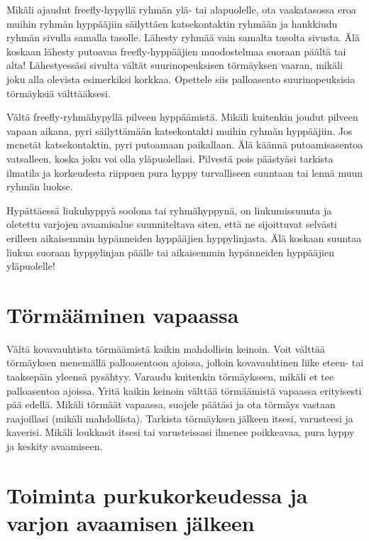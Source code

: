 Mikäli ajaudut freefly-hypyllä ryhmän ylä- tai alapuolelle, ota vaakatasossa eroa muihin ryhmän hyppääjiin säilyttäen katsekontaktin ryhmään ja hankkiudu ryhmän sivulla samalla tasolle. Lähesty ryhmää vain samalta tasolta sivusta. Älä koskaan lähesty putoavaa freefly-hyppääjien muodostelmaa suoraan päältä tai alta! Lähestyessäsi sivulta vältät suurinopeuksisen törmäyksen vaaran, mikäli joku alla olevista esimerkiksi korkkaa. Opettele siis palloasento suurinopeuksisia törmäyksiä välttääksesi. 


Vältä freefly-ryhmähypyllä pilveen hyppäämistä. Mikäli kuitenkin joudut pilveen vapaan aikana, pyri säilyttämään katsekontakti muihin ryhmän hyppääjiin. Jos menetät katsekontaktin, pyri putoamaan paikallaan. Älä käännä putoamisasentoa vatsalleen, koska joku voi olla yläpuolellasi. Pilvestä pois päästyäsi tarkista ilmatila ja korkeudesta riippuen pura hyppy turvalliseen suuntaan tai lennä muun ryhmän luokse. 


Hypättäessä liukuhyppyä soolona tai ryhmähyppynä, on liukumissuunta ja oletettu varjojen avaamisalue suunniteltava siten, että ne sijoittuvat selvästi erilleen aikaisemmin hypänneiden hyppääjien hyppylinjasta. Älä koskaan suuntaa liukua suoraan hyppylinjan päälle tai aikaisemmin hypänneiden hyppääjien yläpuolelle! 

\section{ Törmääminen vapaassa }
\label{turvallisuus-freehyppaamisessa-tormaaminen-vapaassa}


Vältä kovavauhtista törmäämistä kaikin mahdollisin keinoin. Voit välttää törmäyksen menemällä palloasentoon ajoissa, jolloin kovavauhtinen liike eteen- tai taaksepäin yleensä pysähtyy. Varaudu kuitenkin törmäykseen, mikäli et tee palloasentoa ajoissa. Yritä kaikin keinoin välttää törmäämistä vapaassa erityisesti pää edellä. Mikäli törmäät vapaassa, suojele päätäsi ja ota törmäys vastaan raajoillasi (mikäli mahdollista). Tarkista törmäyksen jälkeen itsesi, varusteesi ja kaverisi. Mikäli loukkasit itsesi tai varusteissasi ilmenee poikkeavaa, pura hyppy ja keskity avaamiseen. 

\section{ Toiminta purkukorkeudessa ja varjon avaamisen jälkeen }
\label{turvallisuus-freehyppaamisessa-toiminta-purkukorkeudessa-ja-varjon-avaamisen-jalkeen}



